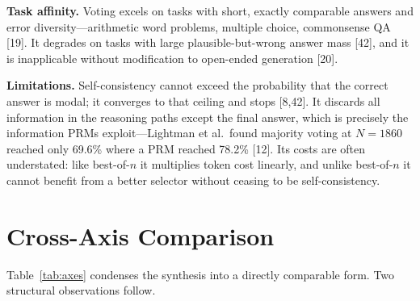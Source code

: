 \documentclass[10pt]{article}
\begin{document}
\textbf{Task affinity.} Voting excels on tasks with short, exactly comparable answers and error diversity---arithmetic word problems, multiple choice, commonsense QA [19]. It degrades on tasks with large plausible-but-wrong answer mass [42], and it is inapplicable without modification to open-ended generation [20].

\textbf{Limitations.} Self-consistency cannot exceed the probability that the correct answer is modal; it converges to that ceiling and stops [8,42]. It discards all information in the reasoning paths except the final answer, which is precisely the information PRMs exploit---Lightman et al.\ found majority voting at $N{=}1860$ reached only 69.6\% where a PRM reached 78.2\% [12]. Its costs are often understated: like best-of-$n$ it multiplies token cost linearly, and unlike best-of-$n$ it cannot benefit from a better selector without ceasing to be self-consistency.

\section{Cross-Axis Comparison}
\label{sec:comparison}

Table~\ref{tab:axes} condenses the synthesis into a directly comparable form. Two structural observations follow.
\end{document}

